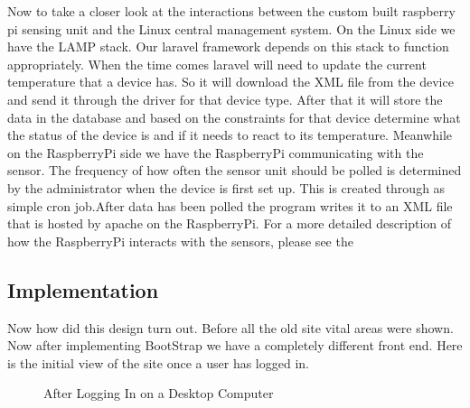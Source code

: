 \documentclass{report}
\begin{document}
\indent
Now to take a closer look at the interactions between the custom built raspberry pi sensing unit and the Linux central management system. On the Linux side we have the LAMP stack. Our laravel framework depends on this stack to function appropriately. When the time comes laravel will need to update the current temperature that a device has. So it will download the XML file from the device and send it through the driver for that device type. After that it will store the data in the database and based on the constraints for that device determine what the status of the device is and if it needs to react to its temperature. 
\newline
\indent
Meanwhile on the RaspberryPi side we have the RaspberryPi communicating with the sensor. The frequency of how often the sensor unit should be polled is determined by the administrator when the device is first set up. This is created through as simple cron job.After data has been polled the program writes it to an XML file that is hosted by apache on the RaspberryPi. For a more detailed description of how the RaspberryPi interacts with the sensors, please see the  
\newpage

\subsection*{Implementation}
\indent
\indent
Now how did this design turn out. Before all the old site vital areas were shown. Now after implementing BootStrap we have a completely different front end. Here is the initial view of the site once a user has logged in.
\begin{figure}[H]
	\caption{After Logging In on a Desktop Computer}
\end{figure}
\newpage
\end{document}

